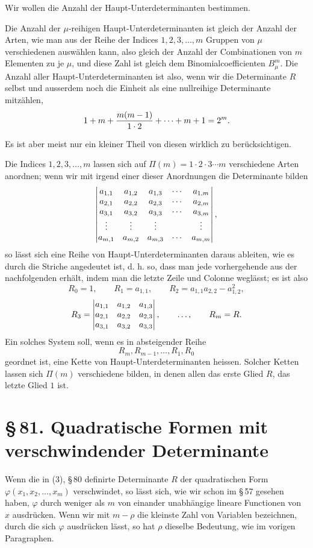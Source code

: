 \documentclass[11pt]{article}
\providecommand{\sect}[2]{\section*{\S\,#1. #2}}
\begin{document}
Wir wollen die Anzahl der Haupt-Unterdeterminanten bestimmen.

Die Anzahl der $\mu$-reihigen Haupt-Unterdeterminanten ist gleich der Anzahl der Arten, wie man aus der Reihe der Indices $1,2,3,\ldots,m$ Gruppen von $\mu$ verschiedenen ausw\"ahlen kann, also gleich der Anzahl der Combinationen von $m$ Elementen zu je $\mu$, und diese Zahl ist gleich dem Binomialcoefficienten $B^m_\mu$. Die Anzahl aller Haupt-Unterdeterminanten ist also, wenn wir die Determinante $R$ selbst und ausserdem noch die Einheit als eine nullreihige Determinante mitz\"ahlen,
\[
        1+m+{m(m-1)\over 1\cdot 2}+\cdots+m+1=2^m.
\]

Es ist aber meist nur ein kleiner Theil von diesen wirklich zu ber\"ucksichtigen.

Die Indices $1,2,3,\ldots,m$ lassen sich auf $\Pi(m)=1\cdot2\cdot3\cdots m$ verschiedene Arten anordnen; wenn wir mit irgend einer dieser Anordnungen die Determinante bilden
\[
\begin{vmatrix}
 a_{1,1} & a_{1,2} & a_{1,3} & \cdots & a_{1,m}\cr
 a_{2,1} & a_{2,2} & a_{2,3} & \cdots & a_{2,m}\cr
 a_{3,1} & a_{3,2} & a_{3,3} & \cdots & a_{3,m}\cr
 \vdots  & \vdots  & \vdots  &        & \vdots\cr
 a_{m,1} & a_{m,2} & a_{m,3} & \cdots & a_{m,m}
\end{vmatrix},
\]
so l\"asst sich eine Reihe von Haupt-Unterdeterminanten daraus ableiten, wie es durch die Striche angedeutet ist, d. h. so, dass man jede vorhergehende aus der nachfolgenden erh\"alt, indem man die letzte Zeile und Colonne wegl\"asst; es ist also
\[
        R_0=1,
        \qquad R_1=a_{1,1},
        \qquad R_2=a_{1,1}a_{2,2}-a_{1,2}^2,
\]
\[
        R_3=\begin{vmatrix}
        a_{1,1}&a_{1,2}&a_{1,3}\cr
        a_{2,1}&a_{2,2}&a_{2,3}\cr
        a_{3,1}&a_{3,2}&a_{3,3}
        \end{vmatrix},
        \qquad\ldots,
        \qquad R_m=R.
\]
Ein solches System soll, wenn es in absteigender Reihe
\[
        R_m,R_{m-1},\ldots,R_1,R_0
\]
geordnet ist, eine Kette von Haupt-Unterdeterminanten heissen. Solcher Ketten lassen sich $\Pi(m)$ verschiedene bilden, in denen allen das erste Glied $R$, das letzte Glied $1$ ist.

\sect{81}{Quadratische Formen mit verschwindender Determinante}

Wenn die in (3), \S\,80 definirte Determinante $R$ der quadratischen Form $\varphi(x_1,x_2,\ldots,x_m)$ verschwindet, so l\"asst sich, wie wir schon im \S\,57 gesehen haben, $\varphi$ durch weniger als $m$ von einander unabh\"angige lineare Functionen von $x$ ausdr\"ucken. Wenn wir mit $m-\rho$ die kleinste Zahl von Variablen bezeichnen, durch die sich $\varphi$ ausdr\"ucken l\"asst, so hat $\rho$ dieselbe Bedeutung, wie im vorigen Paragraphen.
\end{document}
